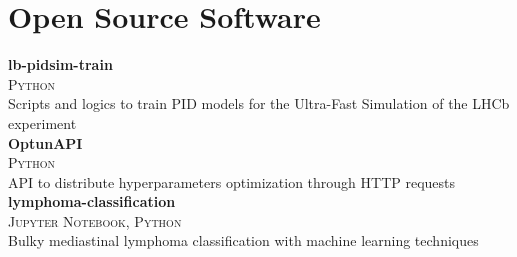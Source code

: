\newcommand{\pkgname}[1]
  {\normalsize \color{hlcolor-0} \textbf{#1}}

\newcommand{\pkginfo}[1]
  {\small \color{hlcolor-1} \textsc{#1}}
  
\newcommand{\pkgdesc}[1]
  {\normalsize \color{maincolor} {#1}}


\section*{Open Source Software}
\begin{cvcontent}
  \pkgname{lb-pidsim-train} \hfill
  \\
  \pkginfo{Python}\\
  \pkgdesc{Scripts and logics to train PID models for the Ultra-Fast Simulation of the LHCb experiment}
  \\ [3mm]
  \pkgname{OptunAPI} \hfill
  \\
  \pkginfo{Python}\\
  \pkgdesc{API to distribute hyperparameters optimization through HTTP requests}
  \\ [3mm]
  \pkgname{lymphoma-classification} \hfill
  \\
  \pkginfo{Jupyter Notebook, Python}\\
  \pkgdesc{Bulky mediastinal lymphoma classification with machine learning techniques}
\end{cvcontent}